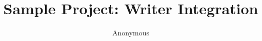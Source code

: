\documentclass{article}
\title{Sample Project: Writer Integration}
\author{Anonymous}
\date{}
\begin{document}
\maketitle
\begin{abstract}

\end{abstract}









\end{document}

